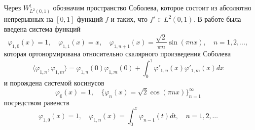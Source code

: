 Через $W^1_{L^2(0,1)}$ обозначим пространство Соболева, которое состоит из абсолютно непрерывных на $[0,1]$ функций $f$ и таких, что $f{'}\in L^2(0,1)$.
В работе \cite{RamShaMag} была введена система функций
\begin{equation}\label{GasRam-eq1}
 \varphi_{1,0}(x)=1,\quad \varphi_{1,1}(x)=x,\quad \varphi_{1,n+1}(x)=\frac{\sqrt{2}}{\pi n}\sin(\pi nx),\quad n=1,2,\ldots,
\end{equation}
которая ортонормирована относительно скалярного произведения Соболева
\begin{equation*}
\langle\varphi_{1,n},\varphi_{1,m}\rangle=\varphi_{1,n}(0)\varphi_{1,m}(0)+\int_0^1\varphi'_{1,n}(x)\varphi'_{1,m}(x)dx
\end{equation*}
и порождена системой косинусов
\begin{equation}\label{GasRam-eq2}
\varphi_0(x)=1,\quad \{\varphi_n(x)=\sqrt{2}\cos(\pi nx)\}_{n=1}^\infty
\end{equation}
посредством равенств
$$
 \varphi_{1,0}(x)=1,\quad \varphi_{1,n}(x)=\int_0^x \varphi_{n-1}(t)dt, \quad n=1,2,\ldots
$$

